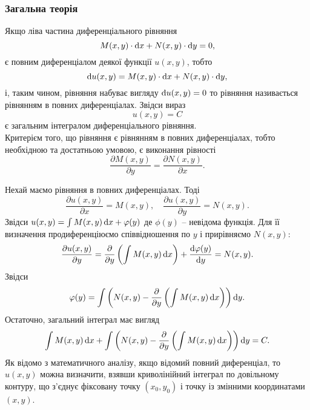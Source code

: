 \subsubsection{Загальна теорія}
Якщо ліва частина диференціального рівняння
\begin{equation*}
	M(x, y) \cdot \mathop{}\!\mathrm{d} x + N(x, y) \cdot \mathop{}\!\mathrm{d} y = 0,
\end{equation*}
є повним диференціалом деякої функції $u(x, y)$, тобто
\begin{equation*}
	\mathop{}\!\mathrm{d} u(x, y) = M(x, y) \cdot \mathop{}\!\mathrm{d} x + N(x, y) \cdot \mathop{}\!\mathrm{d} y,
\end{equation*}
і, таким чином, рівняння набуває вигляду $\mathop{}\!\mathrm{d} u (x, y) = 0$ то рівняння називається рівнянням в повних диференціалах. Звідси вираз
\begin{equation*}
	u(x, y) = C
\end{equation*}
є загальним інтегралом диференціального рівняння. \\

Критерієм того, що рівняння є рівнянням в повних диференціалах, тобто необхідною та достатньою умовою, є виконання рівності
\begin{equation*}
	\frac{\partial M(x, y)}{\partial y} = \frac{\partial N(x, y)}{\partial x}.
\end{equation*}
 
Нехай маємо рівняння в повних диференціалах. Тоді
\begin{equation*}
	\frac{\partial u(x, y)}{\partial x} = M(x, y), \quad \frac{\partial u(x, y)}{\partial y} = N(x, y).
\end{equation*}
Звідси $u(x, y) = \int M(x, y) \mathop{}\!\mathrm{d} x + \varphi(y)$ де $\phi(y)$ -- невідома функція. Для її визначення продиференціюємо співвідношення по $y$ і прирівняємо $N(x, y)$:
\begin{equation*}
	\frac{\partial u(x, y)}{\partial y} = \frac{\partial}{\partial y} \left( \int M(x, y) \mathop{}\!\mathrm{d} x \right) + \frac{\mathop{}\!\mathrm{d} \varphi(y)}{\mathop{}\!\mathrm{d} y} = N(x, y).
\end{equation*}
Звідси
\begin{equation*}
	\varphi(y) = \int \left( N(x, y) - \frac{\partial}{\partial y} \left( \int M(x, y) \mathop{}\!\mathrm{d} x \right) \right) \mathop{}\!\mathrm{d} y.
\end{equation*}
Остаточно, загальний інтеграл має вигляд
\begin{equation*}
	\int M(x, y) \mathop{}\!\mathrm{d} x + \int \left( N(x, y) - \frac{\partial}{\partial y} \left( \int M(x, y) \mathop{}\!\mathrm{d} x \right) \right) \mathop{}\!\mathrm{d} y = C.
\end{equation*}
Як відомо з математичного аналізу, якщо відомий повний диференціал, то $u(x, y)$ можна визначити, взявши криволінійний інтеграл по довільному контуру, що з’єднує фіксовану точку $(x_0, y_0)$ і точку із змінними координатами $(x, y)$. \\

